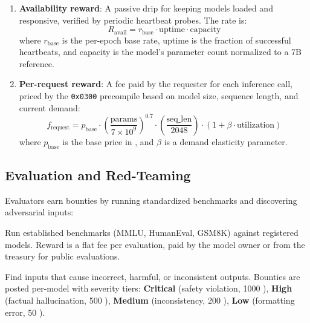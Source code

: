 \begin{enumerate}
    \item \textbf{Availability reward}: A passive \BLG{} drip for keeping models loaded and responsive, verified by periodic heartbeat probes. The rate is:
    \begin{equation}
    R_{\text{avail}} = r_{\text{base}} \cdot \text{uptime} \cdot \text{capacity}
    \end{equation}
    where $r_{\text{base}}$ is the per-epoch base rate, uptime is the fraction of successful heartbeats, and capacity is the model's parameter count normalized to a 7B reference.

    \item \textbf{Per-request reward}: A fee paid by the requester for each inference call, priced by the \texttt{0x0300} precompile based on model size, sequence length, and current demand:
    \begin{equation}
    f_{\text{request}} = p_{\text{base}} \cdot \left(\frac{\text{params}}{7 \times 10^9}\right)^{0.7} \cdot \left(\frac{\text{seq\_len}}{2048}\right) \cdot (1 + \beta \cdot \text{utilization})
    \end{equation}
    where $p_{\text{base}}$ is the base price in \BLG{}, and $\beta$ is a demand elasticity parameter.
\end{enumerate}

\subsection{Evaluation and Red-Teaming}

Evaluators earn \BLG{} bounties by running standardized benchmarks and discovering adversarial inputs:

\begin{description}[nosep]
    \item[Benchmark execution] Run established benchmarks (MMLU, HumanEval, GSM8K) against registered models. Reward is a flat fee per evaluation, paid by the model owner or from the \DAO{} treasury for public evaluations.
    \item[Adversarial discovery] Find inputs that cause incorrect, harmful, or inconsistent outputs. Bounties are posted per-model with severity tiers: \textbf{Critical} (safety violation, 1000 \BLG{}), \textbf{High} (factual hallucination, 500 \BLG{}), \textbf{Medium} (inconsistency, 200 \BLG{}), \textbf{Low} (formatting error, 50 \BLG{}).
\end{description}

